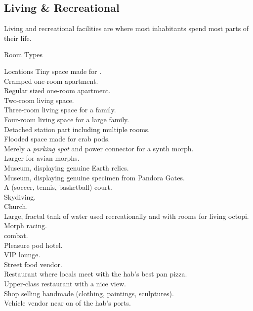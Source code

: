 \documentclass[a4]{book}
\begin{document}
\begin{multicols}{2}


\subsection*{Living \& Recreational}

Living and recreational facilities are where most inhabitants spend most parts of their life.

Room Types

\end{multicols}


\begin{tableone}{Locations}
Tiny space made for .\\
Cramped one-room apartment.\\
Regular sized one-room apartment.\\
Two-room living space.\\
Three-room living space for a family.\\
Four-room living space for a large family.\\
Detached station part including multiple rooms.\\
Flooded space made for crab pods.\\
Merely a \textit{parking spot} and power connector for a synth morph.\\
Larger  for avian morphs.\\
Museum, displaying genuine Earth relics.\\
Museum, displaying genuine specimen from Pandora Gates.\\
A (soccer, tennis, basketball) court.\\
Skydiving.\\
Church.\\
Large, fractal tank of water used recreationally and with rooms for living octopi.\\
Morph racing.\\
 combat.\\
Pleasure pod hotel.\\
VIP lounge.\\
Street food vendor.\\
Restaurant where locals meet with the hab's best pan pizza.\\
Upper-class restaurant with a nice view.\\
Shop selling handmade (clothing, paintings, sculptures).\\
Vehicle vendor near on of the hab's ports.\\
\end{tableone}
\end{document}
